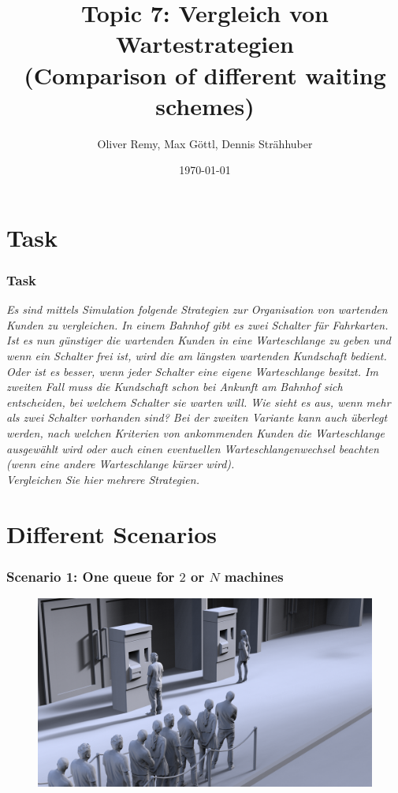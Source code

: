 \documentclass{beamer}
\title{Topic 7: Vergleich von Wartestrategien \\ (Comparison of different waiting schemes)}
\author{Oliver Remy, Max Göttl, Dennis Strähhuber}
\date{\today}
\begin{document}
\begin{frame}
\maketitle
\end{frame}

\begin{frame}
\tableofcontents
\end{frame}

\section{Task}
\begin{frame}
\frametitle{Task}
\textit{Es sind mittels Simulation folgende Strategien zur Organisation von wartenden Kunden zu vergleichen. In einem Bahnhof gibt es zwei Schalter für Fahrkarten. Ist es nun günstiger die wartenden Kunden in eine Warteschlange zu geben und wenn ein Schalter frei ist, wird die am längsten wartenden Kundschaft bedient. Oder ist es besser, wenn jeder Schalter eine eigene Warteschlange besitzt. Im zweiten Fall muss die Kundschaft schon bei Ankunft am Bahnhof sich entscheiden, bei welchem Schalter sie warten will. Wie sieht es aus, wenn mehr als zwei Schalter vorhanden sind? Bei der zweiten Variante kann auch überlegt werden, nach welchen Kriterien von ankommenden Kunden die Warteschlange ausgewählt wird oder auch einen eventuellen Warteschlangenwechsel beachten (wenn eine andere Warteschlange kürzer wird).\\Vergleichen Sie hier mehrere Strategien. }
\end{frame}

\section{Different Scenarios}
\begin{frame}
\frametitle{Scenario 1: One queue for $2$ or $N$ machines}
\begin{figure}
\centering
\includegraphics[width=1\textwidth]{images/scenario1.png}
\end{figure}
\end{frame}
\end{document}
